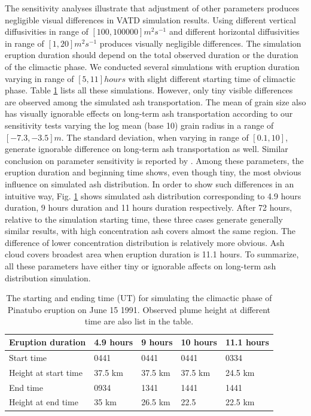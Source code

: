 \documentclass[draft,linenumbers]{agujournal2019}
\begin{document}
The sensitivity analyses illustrate that adjustment of other parameters produces negligible visual differences in VATD simulation results. Using different vertical diffusivities in range of $[100, 100000] m^2s^{-1} $ and different horizontal diffusivities in range of $[1, 20] m^2s^{-1}$ produces visually negligible differences.  The simulation eruption duration should depend on the total observed duration or the duration of the climactic phase. We conducted several simulations with eruption duration varying in range of $[5, 11] hours$ with slight different starting time of climactic phase. Table \ref{tab:Pinatubo-eruption-duration} lists all these simulations. However, only tiny visible differences are observed among the simulated ash transportation. The mean of grain size also has visually ignorable effects on long-term ash transportation according to our sensitivity tests varying the log mean (base 10) grain radius in a range of $[-7.3, -3.5] m$.  The standard deviation, when varying in range of $[0.1, 10]$, generate ignorable difference on long-term ash transportation as well. Similar conclusion on parameter sensitivity is reported by \citet[e.g.][]{fero2008simulation, daniele2009applications}.  Among these parameters, the eruption duration and beginning time shows, even though tiny, the most obvious influence on simulated ash distribution. In order to show such differences in an intuitive way, Fig. \ref{tab:Pinatubo-eruption-duration} shows simulated ash distribution corresponding to 4.9 hours duration, 9 hours duration and 11 hours duration respectively. After 72 hours, relative to the simulation starting time, these three cases generate generally similar results, with high concentration ash covers almost the same region. The difference of lower concentration distribution is relatively more obvious. Ash cloud covers broadest area when eruption duration is 11.1 hours. To summarize, all these parameters have either tiny or ignorable affects on long-term ash distribution simulation.

\begin{table}[htp]
\centering
      \caption{The starting and ending time (UT) for simulating the climactic phase of Pinatubo eruption on June 15 1991. Observed plume height \citep{holasek1996satellite} at different time are also list in the table.}		
	  \begin{tabular}{p{35mm}p{20mm}p{20mm}p{20mm}p{20mm}}
	    \hline
        Eruption duration & 4.9 hours & 9 hours & 10 hours & 11.1 hours \\
	    \hline
	    Start time & 0441 & 0441 & 0441 & 0334 \\
	    Height at start time & 37.5 km & 37.5 km  & 37.5 km  & 24.5 km \\
	    
	    End time   & 0934 & 1341 & 1441 & 1441  \\
	    	Height at end time & 35 km & 26.5 km & 22.5 & 22.5 km \\
	    \hline
	  \end{tabular}
	  \label{tab:Pinatubo-eruption-duration}
\end{table}
\end{document}
